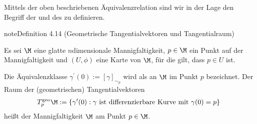 \documentclass[letterpaper,10pt,english]{jupyterBook}
\begin{document}
\sphinxAtStartPar
Mittels der oben beschriebenen Äquivalenzrelation sind wir in der Lage den Begriff der  und des  zu definieren.
\label{manifolds/tangential:definition-5}
\begin{sphinxadmonition}{note}{Definition 4.14 (Geometrische Tangentialvektoren und Tangentialraum)}



\sphinxAtStartPar
Es sei \(\M\) eine glatte \(n\)\sphinxhyphen{}dimensionale Mannigfaltigkeit, \(p\in\M\) ein Punkt auf der Mannigfaltigkeit und \((U,\phi)\) eine Karte von \(\M\), für die gilt, dass \(p\in U\) ist.

\sphinxAtStartPar
Die Äquivalenzklasse \(\gamma^\prime(0):=[\gamma]_{\sim_p}\) wird als  an \(\M\) im Punkt \(p\) bezeichnet.
Der Raum der (geometrischen) Tangentialvektoren
\begin{equation*}
\begin{split}T_p^{\text{geo}}\M := \{\gamma^\prime(0): \gamma\text{ ist differenzierbare Kurve mit }\gamma(0)=p\}\end{split}
\end{equation*}
\sphinxAtStartPar
heißt  der Mannigfaltigkeit \(\M\) am Punkt \(p \in \M\).
\end{sphinxadmonition}
\end{document}

